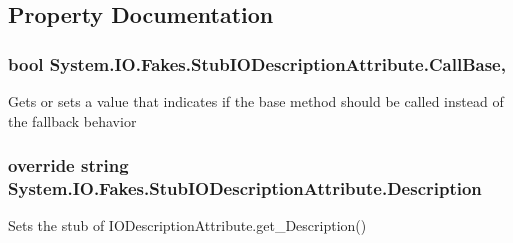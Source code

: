 \subsection{Property Documentation}
\hypertarget{class_system_1_1_i_o_1_1_fakes_1_1_stub_i_o_description_attribute_a80c7cef8e1d8b24b96e1383570a1346d}{
\subsubsection[{Call\-Base}]{\setlength{\rightskip}{0pt plus 5cm}bool System.\-I\-O.\-Fakes.\-Stub\-I\-O\-Description\-Attribute.\-Call\-Base\hspace{0.3cm}{\ttfamily [get]}, {\ttfamily [set]}}}\label{class_system_1_1_i_o_1_1_fakes_1_1_stub_i_o_description_attribute_a80c7cef8e1d8b24b96e1383570a1346d}


Gets or sets a value that indicates if the base method should be called instead of the fallback behavior

\hypertarget{class_system_1_1_i_o_1_1_fakes_1_1_stub_i_o_description_attribute_a4c782ffbf8636fa1b279f6e2de604245}{
\subsubsection[{Description}]{\setlength{\rightskip}{0pt plus 5cm}override string System.\-I\-O.\-Fakes.\-Stub\-I\-O\-Description\-Attribute.\-Description\hspace{0.3cm}{\ttfamily [get]}}}\label{class_system_1_1_i_o_1_1_fakes_1_1_stub_i_o_description_attribute_a4c782ffbf8636fa1b279f6e2de604245}


Sets the stub of I\-O\-Description\-Attribute.\-get\-\_\-\-Description()

